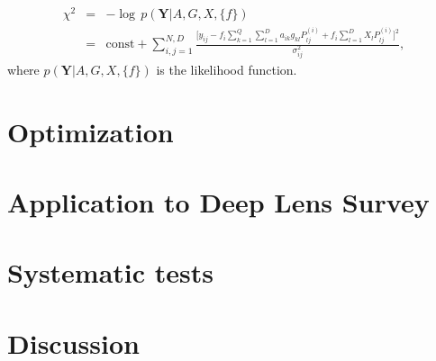 \documentclass[12pt,preprint]{aastex}
\begin{document}
\begin{eqnarray}
\chi^{2} &=& - \log \, p(\mathbf{Y}|A,G,X,\{f\}) \\
         &=& \text{const} + \sum_{i,j=1}^{N,D} \frac{\Big[y_{ij} - 
             f_{i} \sum_{k=1}^{Q}\sum_{l=1}^{D} a_{ik}g_{kl}P^{(i)}_{lj} +
             f_{i}\sum_{l=1}^{D} X_{l}P^{(i)}_{lj}\Big]^{2}}{\sigma_{ij}^{2}},
\label{chi}
\end{eqnarray}
where $p(\mathbf{Y}|A,G,X,\{f\})$ is the likelihood function.


\section{Optimization}\label{sec:opt}


\section{Application to Deep Lens Survey}\label{sec:data}
\section{Systematic tests}\label{sec:sys}
\section{Discussion}\label{sec:discussion} 
\end{document}

